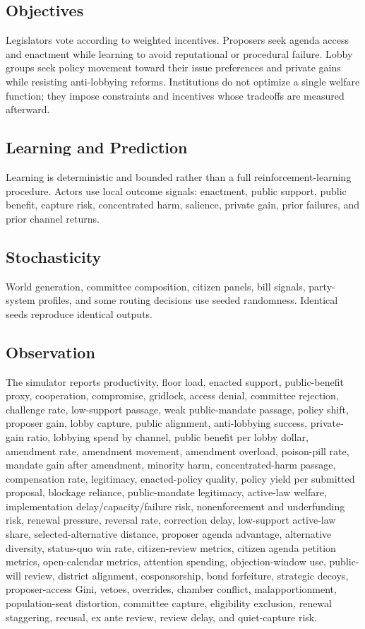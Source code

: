 \documentclass[manuscript,review,anonymous]{acmart}
\begin{document}
\subsection{Objectives}

Legislators vote according to weighted incentives. Proposers seek agenda access and enactment while learning to avoid reputational or procedural failure. Lobby groups seek policy movement toward their issue preferences and private gains while resisting anti-lobbying reforms. Institutions do not optimize a single welfare function; they impose constraints and incentives whose tradeoffs are measured afterward.

\subsection{Learning and Prediction}

Learning is deterministic and bounded rather than a full reinforcement-learning procedure. Actors use local outcome signals: enactment, public support, public benefit, capture risk, concentrated harm, salience, private gain, prior failures, and prior channel returns.

\subsection{Stochasticity}

World generation, committee composition, citizen panels, bill signals, party-system profiles, and some routing decisions use seeded randomness. Identical seeds reproduce identical outputs.

\subsection{Observation}

The simulator reports productivity, floor load, enacted support, public-benefit proxy, cooperation, compromise, gridlock, access denial, committee rejection, challenge rate, low-support passage, weak public-mandate passage, policy shift, proposer gain, lobby capture, public alignment, anti-lobbying success, private-gain ratio, lobbying spend by channel, public benefit per lobby dollar, amendment rate, amendment movement, amendment overload, poison-pill rate, mandate gain after amendment, minority harm, concentrated-harm passage, compensation rate, legitimacy, enacted-policy quality, policy yield per submitted proposal, blockage reliance, public-mandate legitimacy, active-law welfare, implementation delay/capacity/failure risk, nonenforcement and underfunding risk, renewal pressure, reversal rate, correction delay, low-support active-law share, selected-alternative distance, proposer agenda advantage, alternative diversity, status-quo win rate, citizen-review metrics, citizen agenda petition metrics, open-calendar metrics, attention spending, objection-window use, public-will review, district alignment, cosponsorship, bond forfeiture, strategic decoys, proposer-access Gini, vetoes, overrides, chamber conflict, malapportionment, population-seat distortion, committee capture, eligibility exclusion, renewal staggering, recusal, ex ante review, review delay, and quiet-capture risk.
\end{document}
